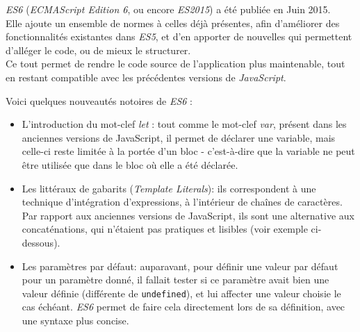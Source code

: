 \bigskip

\emph{ES6} (\emph{ECMAScript Edition 6}, ou encore \emph{ES2015}) a été
publiée en Juin 2015.\\
Elle ajoute un ensemble de normes à celles déjà présentes, afin
d'améliorer des fonctionnalités existantes dans \emph{ES5}, et d'en
apporter de nouvelles qui permettent d'alléger le code, ou de mieux le
structurer.\\
Ce tout permet de rendre le code source de l'application plus
maintenable, tout en restant compatible avec les précédentes versions de
\emph{JavaScript}.

\bigskip

Voici quelques nouveautés notoires de \emph{ES6} :

\begin{itemize}
\item
  L'introduction du mot-clef \emph{let} : tout comme le mot-clef
  \emph{var}, présent dans les anciennes versions de JavaScript, il
  permet de déclarer une variable, mais celle-ci reste limitée à la
  portée d'un bloc - c'est-à-dire que la variable ne peut être utilisée
  que dans le bloc où elle a été déclarée.
\item
  Les littéraux de gabarits (\emph{Template Literals}): ils
  correspondent à une technique d'intégration d'expressions, à
  l'intérieur de chaînes de caractères. Par rapport aux anciennes
  versions de JavaScript, ils sont une alternative aux concaténations,
  qui n'étaient pas pratiques et lisibles (voir exemple ci-dessous).

\begin{Shaded}
\begin{Highlighting}[]
 \OperatorTok{=} 
 \OperatorTok{=} \SpecialCharTok{$\{}\SpecialCharTok{\}}
 \OperatorTok{=} \OperatorTok{;}
 \OperatorTok{=}  \OperatorTok{+} \OperatorTok{;}
\end{Highlighting}
\end{Shaded}
\item
  Les paramètres par défaut: auparavant, pour définir une valeur par
  défaut pour un paramètre donné, il fallait tester si ce paramètre
  avait bien une valeur définie (différente de \texttt{undefined}), et
  lui affecter une valeur choisie le cas échéant. \emph{ES6} permet de
  faire cela directement lors de sa définition, avec une syntaxe plus
  concise.


\end{itemize}
